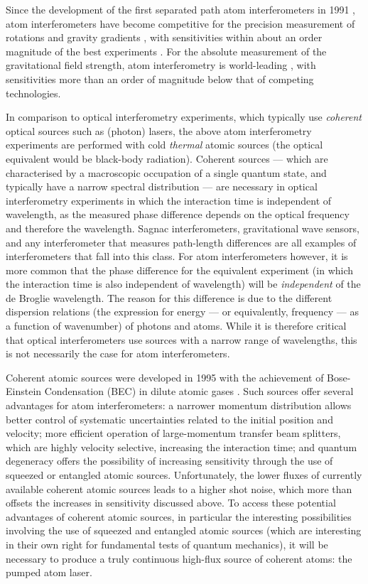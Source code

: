Since the development of the first separated path atom interferometers in 1991 \citep{Carnal:1991,Keith:1991,Riehle:1991,Kasevich:1991}, atom interferometers have become competitive for the precision measurement of rotations \citep{McGuirk:2002} and gravity gradients \citep{Gustavson:2000}, with sensitivities within about an order magnitude of the best experiments \citep{Schreiber:2008,Moody:1993,Kann:1994}.  For the absolute measurement of the gravitational field strength, atom interferometry is world-leading \citep{Muller:2008}, with sensitivities more than an order of magnitude below that of competing technologies.

In comparison to optical interferometry experiments, which typically use \emph{coherent} optical sources such as (photon) lasers, the above atom interferometry experiments are performed with cold \emph{thermal} atomic sources (the optical equivalent would be black-body radiation).  Coherent sources --- which are characterised by a macroscopic occupation of a single quantum state, and typically have a narrow spectral distribution --- are necessary in optical interferometry experiments in which the interaction time is independent of wavelength, as the measured phase difference depends on the optical frequency and therefore the wavelength.  Sagnac interferometers, gravitational wave sensors, and any interferometer that measures path-length differences are all examples of interferometers that fall into this class.  For atom interferometers however, it is more common that the phase difference for the equivalent experiment (in which the interaction time is also independent of wavelength) will be \emph{independent} of the de Broglie wavelength.  The reason for this difference is due to the different dispersion relations (the expression for energy --- or equivalently, frequency --- as a function of wavenumber) of photons and atoms.  While it is therefore critical that optical interferometers use sources with a narrow range of wavelengths, this is not necessarily the case for atom interferometers.

Coherent atomic sources were developed in 1995 with the achievement of Bose-Einstein Condensation (BEC) in dilute atomic gases \citep{Anderson:1995vn,Bradley:1995ys,Davis:1995}.  Such sources offer several advantages for atom interferometers: a narrower momentum distribution allows better control of systematic uncertainties related to the initial position and velocity; more efficient operation of large-momentum transfer beam splitters, which are highly velocity selective, increasing the interaction time; and quantum degeneracy offers the possibility of increasing sensitivity through the use of squeezed or entangled atomic sources.  Unfortunately, the lower fluxes of currently available coherent atomic sources leads to a higher shot noise, which more than offsets the increases in sensitivity discussed above.  To access these potential advantages of coherent atomic sources, in particular the interesting possibilities involving the use of squeezed and entangled atomic sources (which are interesting in their own right for fundamental tests of quantum mechanics), it will be necessary to produce a truly continuous high-flux source of coherent atoms: the pumped atom laser.  

